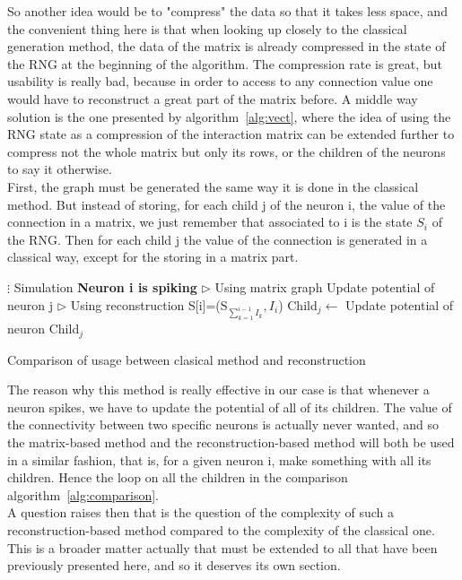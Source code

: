 \documentclass{article}
\begin{document}
		So another idea would be to "compress" the data so that it takes less space, and the convenient thing here is that when looking up closely to the classical generation method, the data of the matrix is already compressed in the state of the RNG at the beginning of the algorithm. The compression rate is great, but usability is really bad, because in order to access to any connection value one would have to reconstruct a great part of the matrix before. A middle way solution is the one presented by algorithm~\ref{alg:vect}, where the idea of using the RNG state as a compression of the interaction matrix can be extended further to compress not the whole matrix but only its rows, or the children of the neurons to say it otherwise.\\\indent
		First, the graph must be generated the same way it is done in the classical method. But instead of storing, for each child j of the neuron i, the value of the connection in a matrix, we just remember that associated to i is the state $S_i$ of the RNG. Then for each child j the value of the connection is generated in a classical way, except for the storing in a matrix part.\\\indent
		\begin{algorithm}
			\begin{algorithmic}
					\State {}
					\State {}
					\State \hspace{1.5cm}$\vdots$ Simulation
					\State \textbf{Neuron i is spiking}
					\State $\triangleright$ Using matrix graph
								\State Update potential of neuron j
							\EndIf
						\EndFor
					\State $\triangleright$ Using reconstruction
						\State S[i]=(S$_{\sum_{k=1}^{i-1}I_k},I_i$)
						\State {}
							\State Child$_j\gets$
							\State Update potential of neuron Child$_j$
						\EndFor
				\EndFunction
			\end{algorithmic}
			\caption{Comparison of usage between clasical method and reconstruction}\label{alg:comparison}
		\end{algorithm}
		The reason why this method is really effective in our case is that whenever a neuron spikes, we have to update the potential of all of its children. The value of the connectivity between two specific neurons is actually never wanted, and so the matrix-based method and the reconstruction-based method will both be used in a similar fashion, that is, for a given neuron i, make something with all its children. Hence the loop on all the children in the comparison algorithm~\ref{alg:comparison}.\\\indent
		A question raises then that is the question of the complexity of such a reconstruction-based method compared to the complexity of the classical one. This is a broader matter actually that must be extended to all that have been previously presented here, and so it deserves its own section.\\\indent
\end{document}
